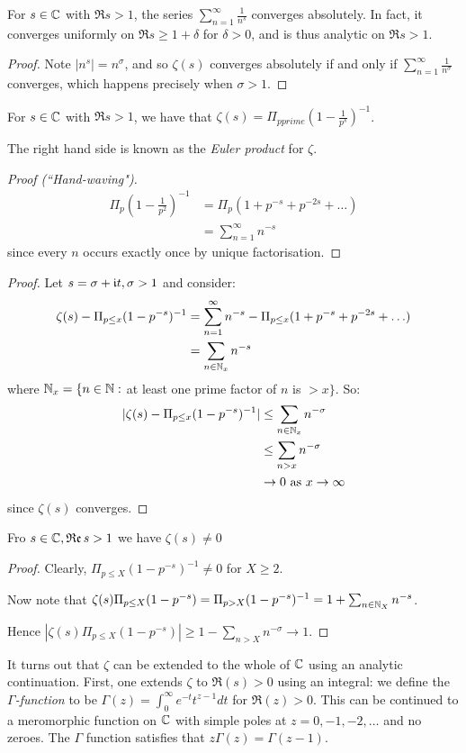 \documentclass[10pt,a4paper]{article}
\begin{document}
\begin{lemma}
For $s \in \mathbb{C}$ with $\Re s > 1$, the series $\sum_{n=1}^\infty \frac{1}{n^s}$ converges absolutely. In fact, it converges uniformly on $\Re s \geq 1+\delta$ for $\delta > 0$, and is thus analytic on $\Re s > 1$.
\end{lemma}
\begin{proof}
Note $|n^s| = n^{\sigma}$, and so $\zeta(s)$ converges absolutely if and only if $\sum_{n=1}^{\infty} \frac{1}{n^{\sigma}}$ converges, which happens precisely when $\sigma > 1$.
\end{proof}

\begin{theorem}
For $s \in \mathbb{C}$ with $\Re s >1$, we have that $\zeta(s) = \Pi_{p prime}\left(1-\frac{1}{p^s}\right)^{-1}$.
\end{theorem}
The right hand side is known as the \emph{Euler product} for $\zeta$.
\begin{proof}[Proof (``Hand-waving")]
\begin{align*}
\Pi_{p}\left(1-\frac{1}{p^2}\right)^{-1} &= \Pi_p \left(1+p^{-s} + p^{-2s} + \ldots \right)\\
&= \sum_{n=1}^{\infty} n^{-s}
\end{align*}
since every $n$ occurs exactly once by unique factorisation.
\end{proof}
\begin{proof}
Let $s = \sigma+\mathfrak{i} t, \sigma>1$ and consider:
\begin{align*}
\zeta(s) - \Pi_{p\leq x} (1-p^{-s})^{-1} &= \sum_{n=1}^{\infty} n^{-s} - \Pi_{p\leq x} (1+p^{-s} + p^{-2s} + \ldots)\\
&= \sum_{n\in \mathbb{N}_x} n^{-s}
\end{align*}
where $\mathbb{N}_x = \{n \in \mathbb{N} : $ at least one prime factor of $n$ is $> x \}$. So:
\begin{align*}
|\zeta(s) - \Pi_{p\leq x}(1-p^{-s})^{-1}| &\leq \sum_{n \in \mathbb{N}_x} n^{-\sigma}\\
&\leq \sum_{n > x} n^{-\sigma}\\
&\to 0 \text{ as } x \to \infty
\end{align*}
since $\zeta(s)$ converges.
\end{proof}
\begin{corollary}
Fro $s \in \mathbb{C}, \operatorname{\mathfrak{Re}} s > 1$ we have $\zeta(s) \neq 0$
\end{corollary}
\begin{proof}
Clearly, $\Pi_{p \leq X} (1-p^{-s})^{-1} \neq 0$ for $X \geq 2$. 

Now note that $\zeta(s) \Pi_{p \leq X}(1-p^{-s}) = \Pi_{p > X}(1-p^{-s})^{-1} = 1+ \sum_{n \in \mathbb{N}_X} n^{-s}$.

Hence $|\zeta(s) \Pi_{p\leq X}(1-p^{-s})| \geq 1-\sum_{n>X} n^{-\sigma} \to 1$.
\end{proof}
It turns out that $\zeta$ can be extended to the whole of $\mathbb{C}$ using an analytic continuation. First, one extends $\zeta$ to $\Re(s) > 0$ using an integral: we define the \emph{$\Gamma$-function} to be $\Gamma(z) = \int_{0}^{\infty} e^{-t}t^{z-1} dt$ for $\Re(z) > 0$. This can be continued to a meromorphic function on $\mathbb{C}$ with simple poles at $z = 0,-1,-2,\ldots$ and no zeroes. The $\Gamma$ function satisfies that $z\Gamma(z) = \Gamma(z-1)$.
\end{document}
